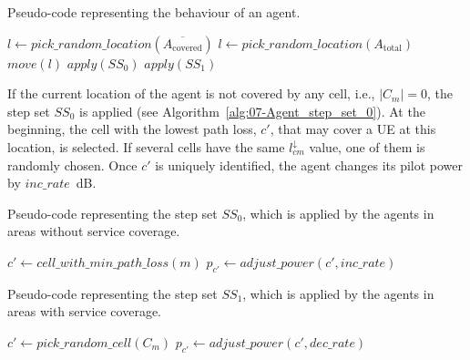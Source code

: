 \begin{algorithm}
\centering

\caption{Pseudo-code representing the behaviour of an agent.\textit{\label{alg:07-Agent-behavior}}}


\begin{algorithmic}
\Repeat
		\State $l \gets pick\_random\_location(\overline{A_{\mathrm{covered}}})$
	\Else
		\State $l \gets pick\_random\_location(A_{\mathrm{total}})$
	\EndIf
	\State $move(l)$
		\State $apply(SS_{0})$
	\Else
			\State $apply(SS_{1})$
		\EndIf
	\EndIf
{}
\end{algorithmic}
\end{algorithm}


If the current location of the agent is not covered by any cell, i.e.,
$\vert C_{m}\vert=0$, the step set $SS_{0}$ is applied (see Algorithm~\ref{alg:07-Agent_step_set_0}).
At the beginning, the cell with the lowest path loss, $c'$, that
may cover a UE at this location, is selected. If several cells have
the same $l_{cm}^{\downarrow}$ value, one of them is randomly chosen.
Once $c'$ is uniquely identified, the agent changes its pilot power
by $inc\_rate$~dB.

\begin{algorithm}
\centering

\caption{Pseudo-code representing the step set $SS_{0}$, which is applied
by the agents in areas without service coverage.\textit{\label{alg:07-Agent_step_set_0}}}


\begin{algorithmic}
\Repeat
	\State $c'\gets cell\_with\_min\_path\_loss(m)$
	\State $p_{c'}\gets adjust\_power(c',inc\_rate)$
\end{algorithmic}
\end{algorithm}


\begin{algorithm}
\centering

\caption{Pseudo-code representing the step set $SS_{1}$, which is applied
by the agents in areas with service coverage.\label{alg:07-Agent_step_set_1}}


\begin{algorithmic}
\Repeat
	\State $c'\gets pick\_random\_cell(C_{m})$
	\State $p_{c'}\gets adjust\_power(c',dec\_rate)$
\end{algorithmic}
\end{algorithm}


